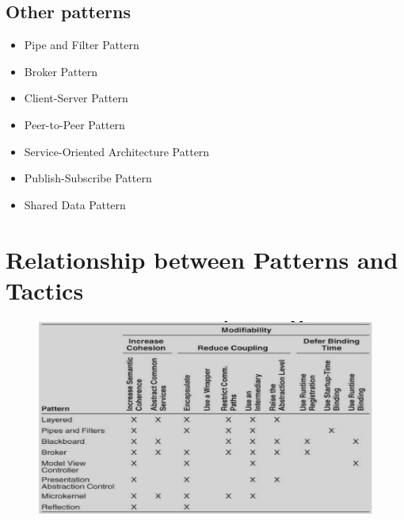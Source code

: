 \documentclass{article}
\begin{document}
\subsection{Other patterns}
\begin{itemize}
\item
  Pipe and Filter Pattern
\item
  Broker Pattern
\item
  Client-Server Pattern
\item
  Peer-to-Peer Pattern
\item
  Service-Oriented Architecture Pattern
\item
  Publish-Subscribe Pattern
\item
  Shared Data Pattern
\end{itemize}

\section{Relationship between Patterns and Tactics}

\begin{figure}[H]
\centering
  \includegraphics[width=1\linewidth]
  {images/relationship.png}
\end{figure}
\end{document}
